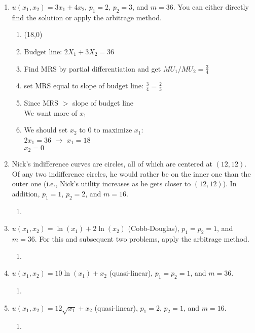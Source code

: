 \documentclass[11pt]{article}
\begin{document}
\begin{enumerate}
\begin{enumerate}
        \item $u(x_{1},x_{2})=3x_{1}+4x_{2}$, $p_{1}=2$, $p_{2}=3$, and $m=36$. You can either directly find the solution or apply the arbitrage method.
        \begin{enumerate}
            \item (18,0)
            \item Budget line: $2X_{1}+3X_{2}=36$
            \item Find MRS by partial differentiation and get $MU_{1}/MU_{2} = \frac{3}{4}$
            \item set MRS equal to slope of budget line: $\frac{3}{4} = \frac{2}{3}$
            \item Since MRS $>$ slope of budget line
            \\We want more of $x_{1}$
            \item We should set $x_{2}$ to 0 to maximize $x_{1}$:\\ $2x_{1}=36$ $\rightarrow$ $x_{1}=18$ \\
            $x_{2}=0$
        \end{enumerate}


        \item Nick's indifference curves are circles, all of which are centered at $(12,12)$. Of any two indifference circles, he would rather be on the inner one than the outer one (i.e., Nick's utility increases as he gets closer to $(12,12)$). In addition, $p_{1}=1$, $p_{2}=2$, and $m=16$.
        \begin{enumerate}
            \item 
        \end{enumerate}

        \item $u(x_{1},x_{2})=\ln(x_{1})+2\ln(x_{2})$ (Cobb-Douglas), $p_{1}=p_{2}=1$, and $m=36$. For this and subsequent two problems, apply the arbitrage method.
        \begin{enumerate}
            \item 
        \end{enumerate}


        \item $u(x_{1},x_{2})=10\ln(x_{1})+x_{2}$ (quasi-linear), $p_{1}=p_{2}=1$, and $m=36$.
        \begin{enumerate}
            \item 
        \end{enumerate}

        \item $u(x_{1},x_{2})=12\sqrt{x_{1}}+x_{2}$ (quasi-linear), $p_{1}=2$, $p_{2}=1$, and $m=16$.
        \begin{enumerate}
            \item 
        \end{enumerate}


\end{enumerate}
\end{enumerate}
\end{document}
